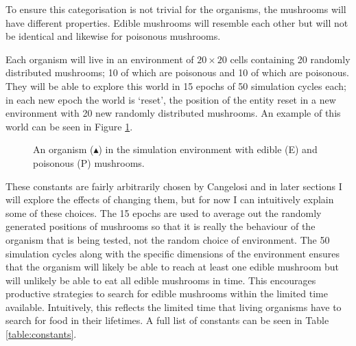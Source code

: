 \documentclass[12pt,a4paper,twoside,openright]{report}
\begin{document}
To ensure this categorisation is not trivial for the organisms, the mushrooms will have different properties. Edible mushrooms will resemble each other but will not be identical and likewise for poisonous mushrooms.

Each organism will live in an environment of $20 \times 20$ cells containing 20 randomly distributed mushrooms; 10 of which are poisonous and 10 of which are poisonous. They will be able to explore this world in 15 epochs of 50 simulation cycles each; in each new epoch the world is `reset', the position of the entity reset in a new environment with 20 new randomly distributed mushrooms. An example of this world can be seen in Figure \ref{fig:environment}.

\begin{figure}[h]
\centering
{}
\caption{An organism ($\blacktriangle$) in the simulation environment with edible (E) and poisonous (P) mushrooms.}
\label{fig:environment}
\end{figure}

These constants are fairly arbitrarily chosen by Cangelosi and in later sections I will explore the effects of changing them, but for now I can intuitively explain some of these choices. The 15 epochs are used to average out the randomly generated positions of mushrooms so that it is really the behaviour of the organism that is being tested, not the random choice of environment. The 50 simulation cycles along with the specific dimensions of the environment ensures that the organism will likely be able to reach at least one edible mushroom but will unlikely be able to eat all edible mushrooms in time. This encourages productive strategies to search for edible mushrooms within the limited time available. Intuitively, this reflects the limited time that living organisms have to search for food in their lifetimes. A full list of constants can be seen in Table \ref{table:constants}.
\end{document}
